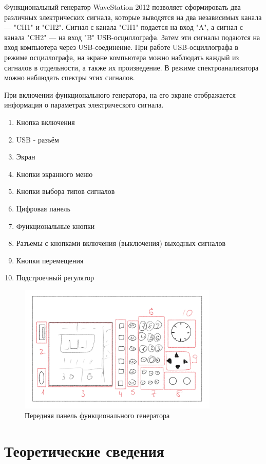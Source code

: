 \documentclass[a4paper, 12pt]{article}
\begin{document}
Функциональный генератор WaveStation 2012 позволяет сформировать два различных электрических сигнала, 
которые выводятся на два независимых канала --- "CH1" и "CH2". Сигнал с канала "CH1" подается на вход "A", а 
сигнал с канала "CH2" --- на вход "B" USB-осциллографа. Затем эти сигналы подаются на вход компьютера через
USB-соединение. При работе USB-осциллографа в режиме осциллографа, на экране компьютера можно наблюдать каждый 
из сигналов в отдельности, а также их произведение. В режиме спектроанализатора можно наблюдать спектры этих сигналов.

При включении функционального генератора, на его экране отображается информация о параметрах электрического сигнала.
\begin{enumerate}
	\item Кнопка включения
	\item USB - разъём
	\item Экран
	\item Кнопки экранного меню
	\item Кнопки выбора типов сигналов
	\item Цифровая панель
	\item Функциональные кнопки
	\item Разъемы с кнопками включения (выключения) выходных сигналов
	\item Кнопки перемещения
	\item Подстроечный регулятор
\end{enumerate}

\begin{figure}[H]
    \centering
    \includegraphics[width=0.85\textwidth]{set1}
    \caption{Передняя панель функционального генератора}
    \label{fig:set1}
\end{figure}
 
\section{Теоретические сведения}
\end{document}

